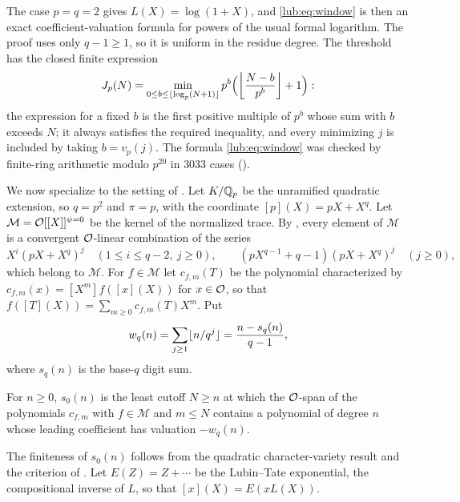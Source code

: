 \begin{remark}\label{lub:rem:Jp}
\sloppy
The case $p=q=2$ gives $L(X)=\log(1+X)$, and \eqref{lub:eq:window} is then an exact
coefficient-valuation formula for powers of the usual formal logarithm. The proof uses only
$q-1\ge1$, so it is uniform in the residue degree. The threshold has the closed finite
expression
\[
 J_p(N)=\min_{0\le b\le\floor{\log_p(N+1)}}p^b\Bigl(\floor*{\frac{N-b}{p^b}}+1\Bigr):
\]
the expression for a fixed $b$ is the first positive multiple of $p^b$ whose sum with $b$
exceeds $N$; it always satisfies the required inequality, and every minimizing $j$ is
included by taking $b=v_p(j)$. The formula \eqref{lub:eq:window} was checked by finite-ring
arithmetic modulo $p^{20}$ in $3033$ cases
\textup{(}\textup{)}.
\end{remark}

We now specialize to the setting of \cite[Section~5]{BergerSprang2025Integer}. Let
$K/\Qp$ be the unramified quadratic extension, so $q=p^2$ and $\pi=p$, with the coordinate
$[p](X)=pX+X^q$. Let $\mathcal M=\OO[[X]]^{\psi=0}$ be the kernel of the normalized trace.
By \cite[Lemma~5.2]{BergerSprang2025Integer}, every element of $\mathcal M$ is a convergent
$\OO$-linear combination of the series
\begin{equation}\label{lub:eq:generators}
 X^i(pX+X^q)^j\quad(1\le i\le q-2,\ j\ge0),\qquad
 (pX^{q-1}+q-1)(pX+X^q)^j\quad(j\ge0),
\end{equation}
which belong to $\mathcal M$. For $f\in\mathcal M$ let $c_{f,m}(T)$ be the polynomial
characterized by $c_{f,m}(x)=[X^m]f([x](X))$ for $x\in\OO$, so that
$f([T](X))=\sum_{m\ge0}c_{f,m}(T)X^m$. Put
\[
 w_q(n)=\sum_{j\ge1}\floor{n/q^j}=\frac{n-s_q(n)}{q-1},
\]
where $s_q(n)$ is the base-$q$ digit sum.

\begin{definition}\label{lub:def:s0}
For $n\ge0$, $s_0(n)$ is the least cutoff $N\ge n$ at which the $\OO$-span of the
polynomials $c_{f,m}$ with $f\in\mathcal M$ and $m\le N$ contains a polynomial of degree
$n$ whose leading coefficient has valuation $-w_q(n)$.
\end{definition}

The finiteness of $s_0(n)$ follows from the quadratic character-variety result and the
criterion of \cite{BergerSprang2025Integer,BergerSprangSteingart2026Bounded}. Let
$E(Z)=Z+\cdots$ be the Lubin--Tate exponential, the compositional inverse of $L$, so that
$[x](X)=E(xL(X))$.

